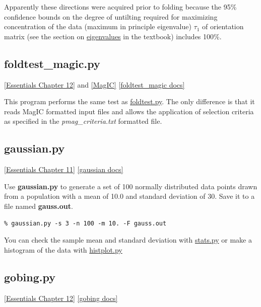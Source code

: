 \documentclass[11pt]{book}
\begin{document}
{{{ Apparently these directions were acquired prior to folding because the 95\% confidence bounds on the degree of untilting required for maximizing concentration of the data (maximum in principle eigenvalue) $\tau_1$ of orientation matrix (see the section on  \href{http://magician.ucsd.edu/Essentials_2/WebBook2ap1.html#orientation_tensor}{eigenvalues} in the textbook) includes 100\%.  
% 
% 
\subsection{foldtest\_magic.py} \href{http://magician.ucsd.edu/Essentials_2/WebBook2ch12.html#ch12}{[Essentials Chapter 12]} and \href{#MagIC}{[MagIC]}
\href{http://earthref.org/PmagPy/pmagpydocs/foldtest_magic-module.html}{[foldtest\_magic docs]}

This program performs the same test as \href{#foldtest.py}{foldtest.py}.  The only difference is that it reads MagIC formatted input files and allows the application of selection criteria as specified in the {\it pmag\_criteria.txt} formatted file.   
% 
% 
\subsection{gaussian.py} 
 \href{http://magician.ucsd.edu/Essentials_2/WebBook2ch11.html#ch11}{[Essentials Chapter 11]}
 \href{http://earthref.org/PmagPy/pmagpydocs/gaussian-module.html}{[gaussian docs]}
 

Use {\bf gaussian.py} to generate a set of 100 normally distributed data points drawn from a population with a mean of 10.0  and   standard deviation of 30.  Save it to a file named {\bf gauss.out}.  

\begin{verbatim}
% gaussian.py -s 3 -n 100 -m 10. -F gauss.out
\end{verbatim}

You can check the sample mean and standard deviation with \href{#stats.py}{stats.py} or make a histogram of the data with \href{#hisplot.py}{histplot.py}




\subsection{gobing.py}
 \href{http://magician.ucsd.edu/Essentials_2/WebBook2ch11.html#ch11}{[Essentials Chapter 12]}
 \href{http://earthref.org/PmagPy/pmagpydocs/gobing-module.html}{[gobing docs]}

}}}
\end{document}
